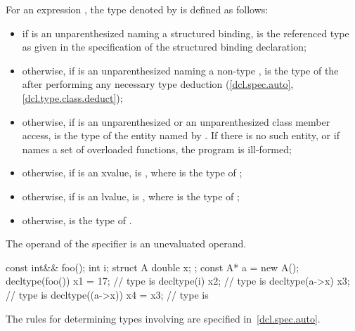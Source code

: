 \pnum
{}%
For an expression , the type denoted by  is defined as follows:

\begin{itemize}
\item if  is an unparenthesized 
naming a structured binding,
 is the referenced type as given in
the specification of the structured binding declaration;

\item otherwise, if  is an unparenthesized 
naming a non-type ,
 is the type of the 
after performing any necessary type deduction
(\ref{dcl.spec.auto}, \ref{dcl.type.class.deduct});

\item otherwise, if  is an unparenthesized  or
an unparenthesized
class
member access,  is the
type of the entity named by . If there is no such entity, or
if  names a set of overloaded functions, the program is
ill-formed;

\item otherwise, if  is
an xvalue,  is , where  is the type
of ;

\item otherwise, if  is an lvalue, 
is , where  is the type of ;

\item otherwise,  is the type of .
\end{itemize}

The operand of the  specifier is an unevaluated
operand.

\begin{example}
\begin{codeblock}
const int&& foo();
int i;
struct A { double x; };
const A* a = new A();
decltype(foo()) x1 = 17;        // type is 
decltype(i) x2;                 // type is 
decltype(a->x) x3;              // type is 
decltype((a->x)) x4 = x3;       // type is 
\end{codeblock}
\end{example}
\begin{note}
The rules for determining types involving  are specified
in~\ref{dcl.spec.auto}.
\end{note}

